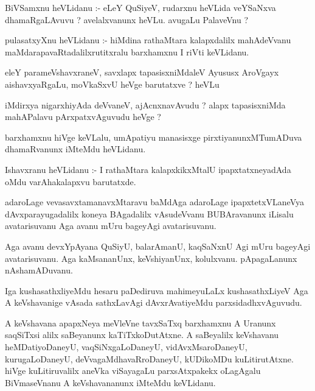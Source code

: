 \documentclass{article}
\begin{document}
\begin{mn}
BiVSamxnu  heVLidanu :- eLeY  QuSiyeV,  rudarxnu  heVLida  veYSaNxva  dhamaRgaLAvuvu ?  avelalxvanunx  heVLu.  avugaLu  PalaveVnu ?
\end{mn}

\begin{mn}
pulasatxyXnu  heVLidanu :- hiMdina  rathaMtara  kalapxdalilx  mahAdeVvanu  maMdarapavaRtadalilxrutitxralu  barxhamxnu  I riVti  keVLidanu.
\end{mn}

\begin{mn}
eleY  parameVshavxraneV,  savxlapx  tapasisxniMdaleV  Ayususx  AroVgayx  aishavxyaRgaLu,  moVkaSxvU  heVge  barutatxve ?  heVLu
\end{mn}

\begin{mn}
iMdirxya  nigarxhiyAda  deVvaneV,  ajAcnxnavAvudu ?  alapx  tapasisxniMda  mahAPalavu  pArxpatxvAguvudu  heVge ?
\end{mn}

\begin{mn}
barxhamxnu  hiVge  keVLalu,  umApatiyu  manasisxge  pirxtiyanunxMTumADuva  dhamaRvanunx  iMteMdu  heVLidanu.
\end{mn}

\begin{mn}
Ishavxranu  heVLidanu :- I  rathaMtara  kalapxkikxMtalU  ipapxtatxneyadAda  oMdu  varAhakalapxvu  barutatxde.
\end{mn}

\begin{mn}
adaroLage  vevasavxtamanavxMtaravu  baMdAga  adaroLage  ipapxtetxVLaneVya  dAvxparayugadalilx  koneya  BAgadalilx  
vAsudeVvanu  BUBAravanunx  iLisalu  avatarisuvanu  Aga  avanu  mUru  bageyAgi  avatarisuvanu.
\end{mn}

\begin{mn}
Aga  avanu  devxYpAyana  QuSiyU,  balarAmanU,  kaqSaNxnU  Agi  mUru  bageyAgi  avatarisuvanu.  Aga  kaMsananUnx,  
keVshiyanUnx,  kolulxvanu.  pApagaLanunx  nAshamADuvanu.
\end{mn}

\begin{mn}
Iga  kushasathxliyeMdu  hesaru  paDediruva  mahimeyuLaLx  kushasathxLiyeV  Aga  A  keVshavanige  vAsada  
sathxLavAgi  dAvxrAvatiyeMdu  parxsidadhxvAguvudu.
\end{mn}

\begin{mn}
A  keVshavana  apapxNeya  meVleVne  tavxSaTxq  barxhamxnu  A  Uranunx  saqSiTxsi  alilx  saBeyanunx  
kaTiTxkoDutAtxne.  A  saBeyalilx  keVshavanu  heMDatiyoDaneyU,  vaqSiNxgaLoDaneyU,  vidAvxMsaroDaneyU,  
kurugaLoDaneyU,  deVvagaMdhavaRroDaneyU,  kUDikoMDu  kuLitirutAtxne.  hiVge  kuLitiruvalilx  aneVka  
viSayagaLu  parxsAtxpakekx  oLagAgalu  BiVmaseVnanu  A  keVshavananunx  iMteMdu  keVLidanu.
\end{mn}
\end{document}
